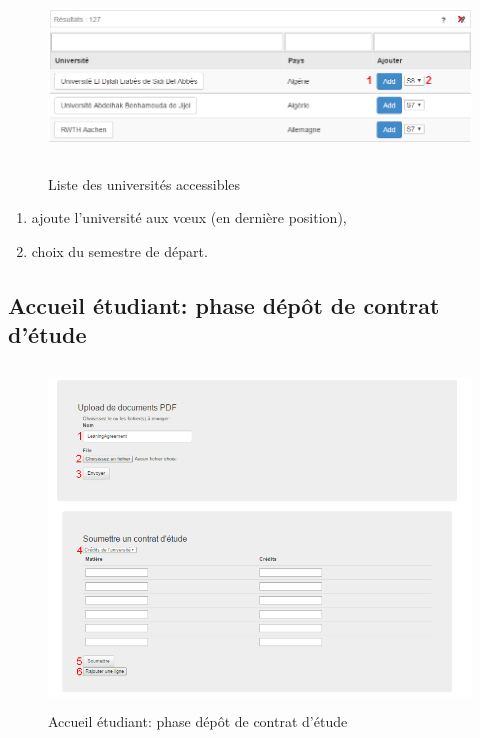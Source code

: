   \begin{figure}[H]
   	\centering
     		
  	\includegraphics[width=16cm,height=5cm]{Images/Etudiant/liste_univ.PNG}
   	\caption{Liste des universités accessibles}
   	\label{listuniv}
  \end{figure}
  
 	\begin{enumerate}
	 \item ajoute l'université aux vœux (en dernière position),
	 \item choix du semestre de départ.
	\end{enumerate}


  \subsection{Accueil étudiant: phase dépôt de contrat d'étude}
	\label{pl}  
  \begin{figure}[H]
  	\centering
  	
  	\includegraphics[width=16cm,height=9cm]{Images/Etudiant/learning_etud.png}
  	\caption{Accueil étudiant: phase dépôt de contrat d'étude}
  \end{figure}
  
